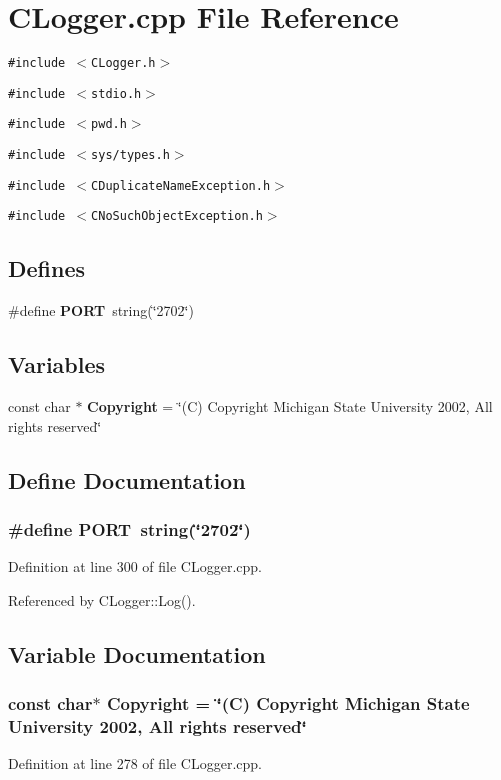 \section{CLogger.cpp File Reference}
\label{CLogger_8cpp}
{\tt \#include $<$CLogger.h$>$}\par
{\tt \#include $<$stdio.h$>$}\par
{\tt \#include $<$pwd.h$>$}\par
{\tt \#include $<$sys/types.h$>$}\par
{\tt \#include $<$CDuplicate\-Name\-Exception.h$>$}\par
{\tt \#include $<$CNo\-Such\-Object\-Exception.h$>$}\par
\subsection*{Defines}
\begin{CompactItemize}
\item 
\#define {\bf PORT}\ string(\char`\"{}2702\char`\"{})
\end{CompactItemize}
\subsection*{Variables}
\begin{CompactItemize}
\item 
const char $\ast$ {\bf Copyright} = \char`\"{}(C) Copyright Michigan State University 2002, All rights reserved\char`\"{}
\end{CompactItemize}


\subsection{Define Documentation}
\subsubsection{\setlength{\rightskip}{0pt plus 5cm}\#define PORT\ string(\char`\"{}2702\char`\"{})}\label{CLogger_8cpp_a0}




Definition at line 300 of file CLogger.cpp.

Referenced by CLogger::Log().

\subsection{Variable Documentation}
\subsubsection{\setlength{\rightskip}{0pt plus 5cm}const char$\ast$ Copyright = \char`\"{}(C) Copyright Michigan State University 2002, All rights reserved\char`\"{}\hspace{0.3cm}{\tt  [static]}}\label{CLogger_8cpp_a1}




Definition at line 278 of file CLogger.cpp.